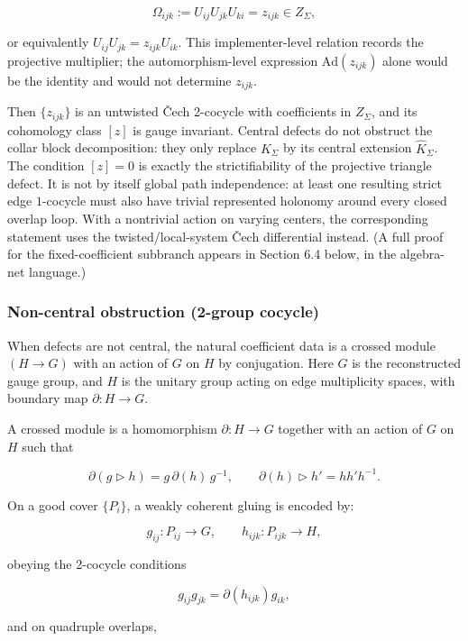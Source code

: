 \[
\Omega_{ijk}:=U_{ij}U_{jk}U_{ki}=z_{ijk}
\in Z_\Sigma,
\]

or equivalently \(U_{ij}U_{jk}=z_{ijk}U_{ik}\). This implementer-level relation records the
projective multiplier; the automorphism-level expression \(\mathrm{Ad}(z_{ijk})\) alone would be
the identity and would not determine \(z_{ijk}\).

Then \(\{z_{ijk}\}\) is an untwisted \v{C}ech 2-cocycle with coefficients in \(Z_\Sigma\), and its cohomology class \([z]\) is gauge invariant. Central defects do not obstruct the collar block decomposition: they only replace \(K_\Sigma\) by its central extension \(\widehat K_\Sigma\). The condition \([z]=0\) is exactly the strictifiability of the projective triangle defect. It is not by itself global path independence: at least one resulting strict edge \(1\)-cocycle must also have trivial represented holonomy around every closed overlap loop. With a nontrivial action on varying centers, the corresponding statement uses the twisted/local-system \v{C}ech differential instead. (A full proof for the fixed-coefficient subbranch appears in Section 6.4 below, in the algebra-net language.)

\subsubsection{Non-central obstruction (2-group cocycle)}\label{34-non-central-obstruction-2-group-cocycle}

When defects are not central, the natural coefficient data is a crossed module \((H \to G)\) with an action of \(G\) on \(H\) by conjugation. Here \(G\) is the reconstructed gauge group, and \(H\) is the unitary group acting on edge multiplicity spaces, with boundary map \(\partial: H \to G\).

A crossed module is a homomorphism \(\partial: H \to G\) together with an action of \(G\) on \(H\) such that

\[
\partial(g \triangleright h) = g\,\partial(h)\,g^{-1},
\qquad
\partial(h) \triangleright h' = h h' h^{-1}.
\]

On a good cover \(\{P_i\}\), a weakly coherent gluing is encoded by:

\[
g_{ij}: P_{ij} \to G,\qquad h_{ijk}: P_{ijk} \to H,
\]

obeying the 2-cocycle conditions

\[
g_{ij} g_{jk} = \partial(h_{ijk}) g_{ik},
\]

and on quadruple overlaps,

